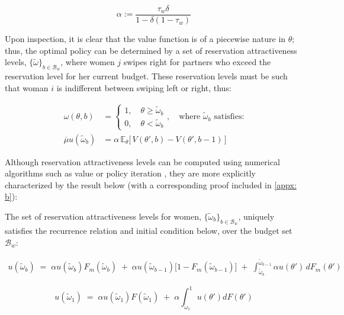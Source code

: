 \begin{equation*}
\alpha:=\frac{\tau_w\delta}{1-\delta(1-\tau_w)}
\end{equation*}

Upon inspection, it is clear that the value function is of a piecewise nature in $\theta$; thus, the optimal policy can be determined by a set of reservation attractiveness levels, $\{\tilde\omega\}_{b\in \mathcal{B}_w}$, where women $j$ swipes right for partners who exceed the reservation level for her current budget. These reservation levels must be such that woman $i$ is indifferent between swiping left or right, thus:

\begin{equation*}
    \begin{split}
        \omega(\theta,b)&=\begin{cases}
            1,\quad \theta\geq \widetilde{\omega}_b \\ 
            0, \quad\theta< \widetilde\omega _b  
        \end{cases} , \quad \text{where $\widetilde{\omega}_b$ satisfies:} \\[8pt] 
        \overline\mu u(\widetilde\omega_b) &= \alpha \, \mathbb{E}_\theta\Big[\,V(\theta',b)-V(\theta',b-1)\,\Big]  
    \end{split}
\end{equation*} 

Although reservation attractiveness levels can be computed using numerical algorithms such as value or policy iteration \citep{rust1987optimal}, they are more explicitly characterized by the result below (with a corresponding proof included in \autoref{appx: b}): 

\begin{proposition}
The set of reservation attractiveness levels for women, $\{\tilde\omega_b\}_{b\in \mathcal{B}_w}$, uniquely satisfies the recurrence relation and initial condition below, over the budget set $\mathcal{B}_w$: 

\begin{equation}\label{eq:recurrence relation}
    \begin{aligned}
        u(\widetilde \omega_b) \;=\; \alpha u(\widetilde \omega_b) F_m(\widetilde \omega_b) \;+\; \alpha u(\widetilde \omega_{b-1}) \Big[1- F_m(\widetilde \omega_{b-1})\Big] \;+\; \int^{\widetilde \omega_{b-1}}_{\widetilde \omega_b} \alpha u(\theta')\,dF_m(\theta')
    \end{aligned} 
\end{equation} 

\begin{equation}\label{eq:initial condition}
    u(\widetilde\omega_1) \;=\; \alpha u(\widetilde\omega_1)F(\widetilde\omega_1) \;+\; \alpha \int^1_{\widetilde\omega_1}u(\theta')dF(\theta')
\end{equation}
\end{proposition} 


